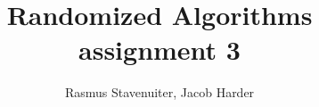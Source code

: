 

\title{Randomized Algorithms assignment 3}
\author{Rasmus Stavenuiter, Jacob Harder}


\maketitle







